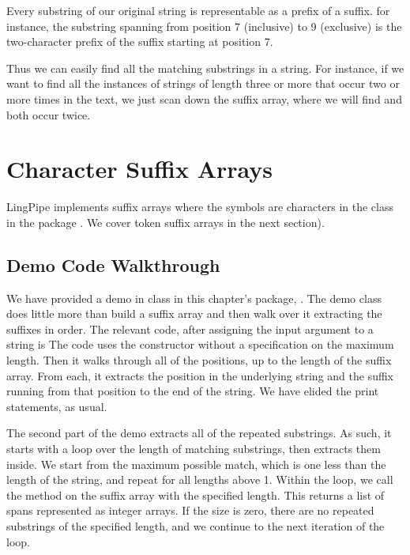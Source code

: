 Every substring of our original string is representable as a prefix
of a suffix.  for instance, the substring  spanning
from position 7 (inclusive) to 9 (exclusive) is the two-character
prefix of the suffix  starting at position 7.

Thus we can easily find all the matching substrings in a string.  For
instance, if we want to find all the instances of strings of length
three or more that occur two or more times in the text, we just scan
down the suffix array, where we will find  and
 both occur twice.




\section{Character Suffix Arrays}

LingPipe implements suffix arrays where the symbols are characters in
the class  in the package
.  We cover token suffix arrays in the
next section).

\subsection{Demo Code Walkthrough}

We have provided a demo in class  in
this chapter's package, .  
The demo class does little more than build a suffix array and then
walk over it extracting the suffixes in order.  The relevant code,
after assigning the input argument to a string  is
%
%
The code uses the constructor without a specification on the maximum
length.  Then it walks through all of the positions, up to the length
of the suffix array.  From each, it extracts the position in the
underlying string and the suffix running from that position to the end
of the string.  We have elided the print statements, as usual.

The second part of the demo extracts all of the repeated substrings.
As such, it starts with a loop over the length of matching substrings,
then extracts them inside.
%
%
We start from the maximum possible match, which is one less
than the length of the string, and repeat for all lengths above 1.
Within the loop, we call the  method on the
suffix array with the specified length.  This returns a list of
spans represented as integer arrays.  If the size is zero, there
are no repeated substrings of the specified length, and we continue
to the next iteration of the loop.  

